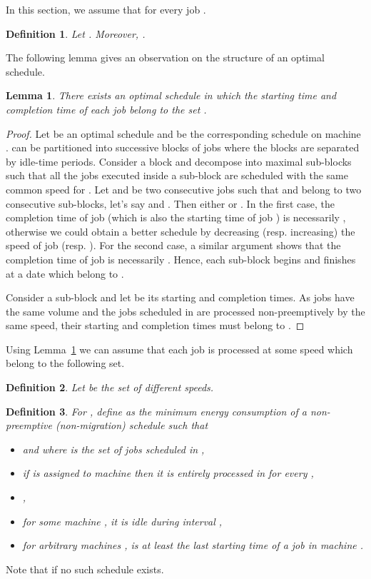 \documentclass[11pt,a4paper]{article}
\newtheorem{lemma}{Lemma}
\newtheorem{definition}{Definition}
\begin{document}
In this section, we assume that  for every job .

\begin{definition}\label{def:Theta_x_y}
Let  
. Moreover, .
\end{definition}


The following lemma gives an observation on the structure of an optimal 
schedule.

\begin{lemma}\label{theta}
There exists an optimal schedule in which the starting time and completion time
of each job belong to the set .
\end{lemma}
\begin{proof}
Let  be an optimal schedule and 
be the corresponding schedule  on machine .
 can be partitioned into successive blocks
of jobs where the blocks are separated by idle-time periods. 
Consider a block  and decompose
 into maximal sub-blocks  such 
that all the jobs executed inside a sub-block  are scheduled with
the same common speed  for . 
Let  and  be two consecutive jobs such
that  and  belong to two consecutive sub-blocks, let's say  and 
. Then either  or .
In the first case, the completion time of job  (which is also the starting time
of job ) is necessarily , otherwise we could obtain a better schedule
by decreasing (resp. increasing) the speed of job  (resp. ).
For the second case, a similar argument shows that the completion time of job 
is necessarily . Hence, each sub-block begins and finishes at a date which belong to . 

Consider a sub-block  and let  be its starting and completion times. 
As jobs have the same volume and 
the jobs scheduled in  are processed non-preemptively by the same speed, 
their starting and completion times must belong to .
\end{proof}

Using Lemma~\ref{theta} we can assume that each job is processed at some speed which belong to the following set.

\begin{definition}	\label{set_of_speed}
Let 
 be the set of different speeds.
\end{definition}


\begin{definition}\label{def:Eksxtu}
For , define  as the minimum energy consumption 
of a non-preemptive (non-migration) schedule  such that 
\begin{itemize}
\item  
	and   where  is the set of jobs scheduled in , 
\item if  is assigned to machine  then it is entirely processed in 
	  for every ,
\item ,
\item for some machine , it is idle during interval ,
\item for arbitrary machines ,  is at least the last 
	starting time of a job in machine . 
\end{itemize}
\end{definition}
Note that  if no such schedule 
exists. 
\end{document}
